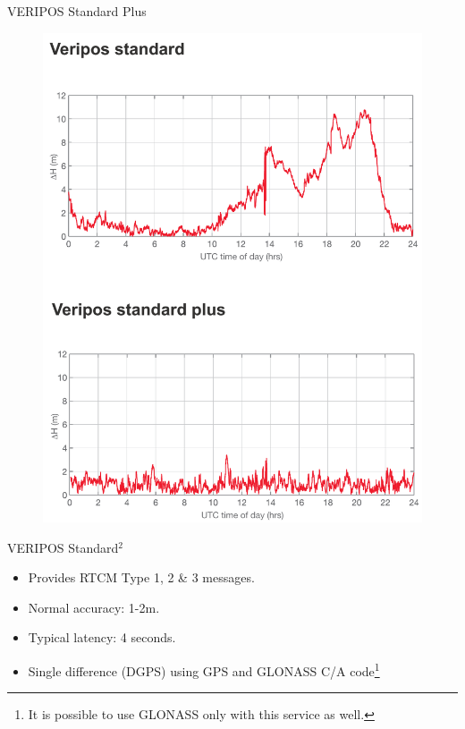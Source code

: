 \documentclass[11pt]{beamer}
\begin{document}
\begin{frame}[plain]{VERIPOS Standard Plus}
	
	\begin{figure}
		\includegraphics[height=0.9\textheight]{pic/StdPlus.png}
	\end{figure}

\end{frame}

\begin{frame}{VERIPOS Standard$^2$}
	
	\begin{itemize}	
		\item Provides RTCM Type 1, 2 \& 3 messages.
		\item Normal accuracy: 1-2m. 
		\item Typical latency: 4 seconds.
		\item Single difference (DGPS) using GPS and GLONASS C/A code\footnote[frame]{It is possible to use GLONASS only with this service as well.}
	\end{itemize}	
	
\end{frame}
\end{document}

